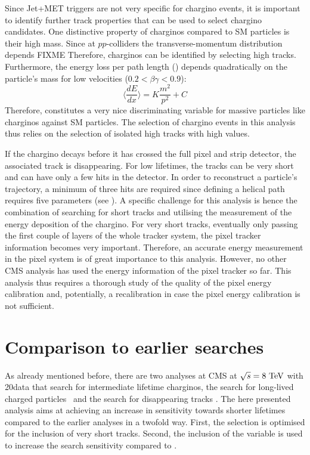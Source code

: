 Since Jet+MET triggers are not very specific for chargino events, it is important to identify further track properties that can be used to select chargino candidates.
One distinctive property of charginos compared to SM particles is their high mass. 
Since at $pp$-colliders the transverse-momentum distribution depends FIXME
Therefore, charginos can be identified by selecting high \pt tracks. 
Furthermore, the energy loss per path length (\dedx) depends quadratically on the particle's mass for low velocities ($0.2<\beta\gamma<0.9$):
\begin{equation}
\langle\frac{dE}{dx}\rangle = K \frac{m^2}{p^2} +C
\end{equation}
Therefore, \dedx constitutes a very nice discriminating variable for massive particles like charginos against SM particles.
The selection of chargino events in this analysis thus relies on the selection of isolated high \pt tracks with high \dedx values. 

If the chargino decays before it has crossed the full pixel and strip detector, the associated track is disappearing. 
For low lifetimes, the tracks can be very short and can have only a few hits in the detector. 
In order to reconstruct a particle's trajectory, a minimum of three hits are required since defining a helical path requires five parameters (see \cite{bib:CMS:tracking_8TeV}). 
A specific challenge for this analysis is hence the combination of searching for short tracks and utilising the measurement of the energy deposition of the chargino. 
For very short tracks, eventually only passing the first couple of layers of the whole tracker system, the pixel tracker information becomes very important. 
Therefore, an accurate energy measurement in the pixel system is of great importance to this analysis. 
However, no other CMS analysis has used the energy information of the pixel tracker so far.
This analysis thus requires a thorough study of the quality of the pixel energy calibration and, potentially, a recalibration in case the pixel energy calibration is not sufficient.



\section{Comparison to earlier searches}
As already mentioned before, there are two analyses at CMS at $\sqrt{s}=8\,\,\text{Te}\kern-0.06667em\text{V}$ with 20\fbinv data that search for intermediate lifetime charginos, the search for long-lived charged \mbox{particles \cite{bib:CMS:HSCP_8TeV}} and the search for disappearing tracks \cite{bib:CMS:DT_8TeV}.
The here presented analysis aims at achieving an increase in sensitivity towards shorter lifetimes compared to the earlier analyses in a twofold way.
First, the selection is optimised for the inclusion of very short tracks.
Second, the inclusion of the variable \dedx is used to increase the search sensitivity compared to \cite{bib:CMS:DT_8TeV}.\\

